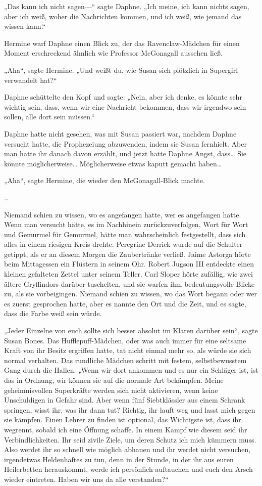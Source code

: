 {„Das kann ich nicht sagen—“ sagte Daphne. „Ich meine, ich kann nichts sagen, aber ich weiß, woher die Nachrichten kommen, und ich weiß, wie jemand das wissen kann.“

Hermine warf Daphne einen Blick zu, der das Ravenclaw-Mädchen für einen Moment erschreckend ähnlich wie Professor McGonagall aussehen ließ.

„Aha“, sagte Hermine. „Und weißt du, wie Susan sich plötzlich in Supergirl verwandelt hat?“

Daphne schüttelte den Kopf und sagte: „Nein, aber ich denke, es könnte sehr wichtig sein, dass, wenn wir eine Nachricht bekommen, dass wir irgendwo sein sollen, alle dort sein müssen.“

Daphne hatte nicht gesehen, was mit Susan passiert war, nachdem Daphne versucht hatte, die Prophezeiung abzuwenden, indem sie Susan fernhielt. Aber man hatte ihr danach davon erzählt, und jetzt hatte Daphne Angst, dass… Sie könnte möglicherweise… Möglicherweise etwas kaputt gemacht haben…

„Aha“, sagte Hermine, die wieder den McGonagall-Blick machte.

…

Niemand schien zu wissen, wo es angefangen hatte, wer es angefangen hatte. Wenn man versucht hätte, es im Nachhinein zurückzuverfolgen, Wort für Wort und Gemurmel für Gemurmel, hätte man wahrscheinlich festgestellt, dass sich alles in einem riesigen Kreis drehte. Peregrine Derrick wurde auf die Schulter getippt, als er an diesem Morgen die Zaubertränke verließ. Jaime Astorga hörte beim Mittagessen ein Flüstern in seinem Ohr. Robert Jugson III entdeckte einen kleinen gefalteten Zettel unter seinem Teller. Carl Sloper hörte zufällig, wie zwei ältere Gryffindors darüber tuschelten, und sie warfen ihm bedeutungsvolle Blicke zu, als sie vorbeigingen. Niemand schien zu wissen, wo das Wort begann oder wer es zuerst gesprochen hatte, aber es nannte den Ort und die Zeit, und es sagte, dass die Farbe weiß sein würde.

„Jeder Einzelne von euch sollte sich besser absolut im Klaren darüber sein“, sagte Susan Bones. Das Hufflepuff-Mädchen, oder was auch immer für eine seltsame Kraft von ihr Besitz ergriffen hatte, tat nicht einmal mehr so, als würde sie sich normal verhalten. Das rundliche Mädchen schritt mit festem, selbstbewusstem Gang durch die Hallen. „Wenn wir dort ankommen und es nur ein Schläger ist, ist das in Ordnung, wir können sie auf die normale Art bekämpfen. Meine geheimnisvollen Superkräfte werden sich nicht aktivieren, wenn keine Unschuldigen in Gefahr sind. Aber wenn fünf Siebtklässler aus einem Schrank springen, wisst ihr, was ihr dann tut? Richtig, ihr lauft weg und lasst mich gegen sie kämpfen. Einen Lehrer zu finden ist optional, das Wichtigste ist, dass ihr wegrennt, sobald ich eine Öffnung schaffe. In einem Kampf wie diesem seid ihr Verbindlichkeiten. Ihr seid zivile Ziele, um deren Schutz ich mich kümmern muss. Also werdet ihr so schnell wie möglich abhauen und ihr werdet nicht versuchen, irgendetwas Heldenhaftes zu tun, denn in der Stunde, in der ihr aus euren Heilerbetten herauskommt, werde ich persönlich auftauchen und euch den Arsch wieder eintreten. Haben wir uns da alle verstanden?“

}
